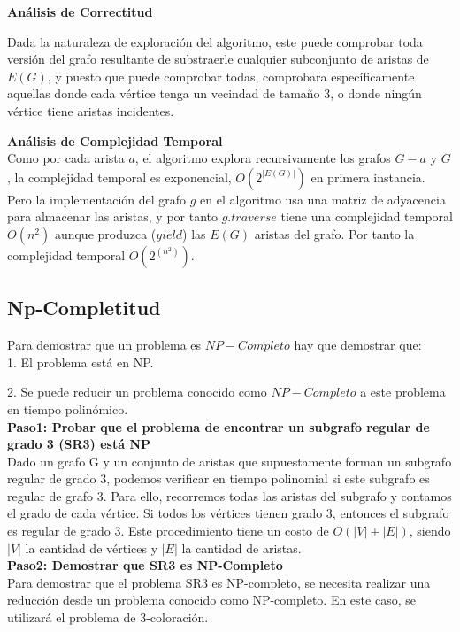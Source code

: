 \documentclass[
10pt, %
a4paper, %
oneside, %
headinclude,footinclude, %
BCOR5mm, %
]{scrartcl}
\begin{document}
\textbf{Análisis de Correctitud}

Dada la naturaleza de exploración del algoritmo, este puede comprobar toda versión del grafo resultante de substraerle cualquier
subconjunto de aristas de $E(G)$, y puesto que puede comprobar todas, comprobara específicamente aquellas donde cada vértice tenga
un vecindad de tamaño 3, o donde ningún vértice tiene aristas incidentes.


\textbf{Análisis de Complejidad Temporal}\\

Como por cada arista $a$, el algoritmo explora recursivamente los grafos $G - a$ y $G$, la complejidad temporal es exponencial, $O (2^|E(G)|)$
en primera instancia. Pero la implementación del grafo $g$ en el algoritmo usa una matriz de adyacencia para almacenar las aristas, y por tanto $g.traverse$
tiene una complejidad temporal $O (n^2)$ aunque produzca ($yield$) las $E(G)$ aristas del grafo. Por tanto la complejidad temporal
$O (2^(n^2))$.


\subsection{Np-Completitud}

Para demostrar que un problema es $NP-Completo$ hay que demostrar que:\\

1. El problema está en NP.

2. Se puede reducir un problema conocido como $NP-Completo$ a este problema en tiempo polinómico.\\

\textbf{Paso1: Probar que el problema de encontrar un subgrafo regular de grado 3 (SR3) está NP }\\


Dado un grafo G y un conjunto de aristas que supuestamente forman un subgrafo regular de grado 3, podemos verificar en 
tiempo polinomial si este subgrafo es regular de grafo 3. Para ello, recorremos todas las aristas del subgrafo y contamos el grado de
cada vértice. Si todos los vértices tienen grado 3, entonces el subgrafo es regular de grado 3. Este procedimiento tiene un costo de 
$O(|V|+|E|)$, siendo $|V|$ la cantidad de vértices y $|E|$ la cantidad de aristas.\\


\textbf{Paso2: Demostrar que SR3 es NP-Completo}\\

Para demostrar que el problema SR3 es NP-completo, se necesita realizar una reducción desde un problema conocido como NP-completo. 
En este caso, se utilizará el problema de 3-coloración.\\
\end{document}
